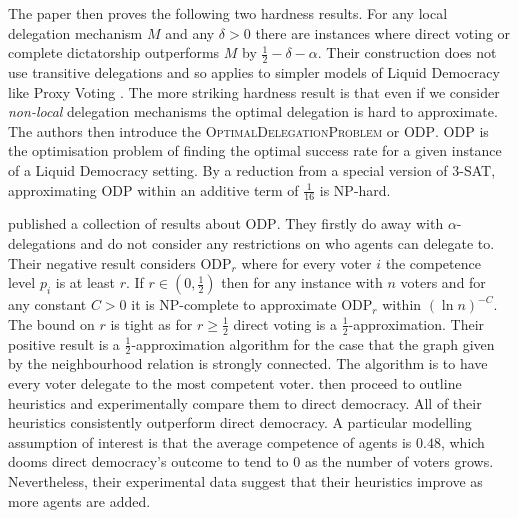 \documentclass[11pt,a4paper, titlepage]{article}
\theoremstyle{definition}
\begin{document}
The paper then proves the following two hardness results.
For any local delegation mechanism $M$ and any $\delta > 0$ there are instances where direct voting or complete dictatorship outperforms $M$ by $\frac{1}{2} - \delta - \alpha$.
Their construction does not use transitive delegations and so applies to simpler models of Liquid Democracy like Proxy Voting \citep{green2015direct}.
The more striking hardness result is that even if we consider \emph{non-local} delegation mechanisms the optimal delegation is hard to approximate.
The authors then introduce the \textsc{OptimalDelegationProblem} or \textsc{ODP}.
\textsc{ODP} is the optimisation problem of finding the optimal success rate for a given instance of a Liquid Democracy setting.
By a reduction from a special version of \textsc{3-SAT}, approximating \textsc{ODP} within an additive term of $\frac{1}{16}$ is NP-hard.

\citet{becker2021can} published a collection of results about \textsc{ODP}. 
They firstly do away with $\alpha$-delegations and do not consider any restrictions on who agents can delegate to.
Their negative result considers \textsc{ODP}$_r$ where for every voter $i$ the competence level $p_i$ is at least  $r$.
If $r \in \left(0, \frac{1}{2} \right)$ then for any instance with $n$ voters and for any constant $C > 0$ it is NP-complete to approximate \textsc{ODP}$_r$ within $(\ln n)^{-C}$.
The bound on $r$ is tight as for $r \geq \frac{1}{2}$ direct voting is a $\frac{1}{2}$-approximation.
Their positive result is a $\frac{1}{2}$-approximation algorithm for the case that the graph given by the neighbourhood relation is strongly connected.
The algorithm is to have every voter delegate to the most competent voter.
\citeauthor{becker2021can} then proceed to outline heuristics and experimentally compare them to direct democracy.
All of their heuristics consistently outperform direct democracy.
A particular modelling assumption of interest is that the average competence of agents is $0.48$, which dooms direct democracy's outcome to tend to 0 as the number of voters grows.
Nevertheless, their experimental data suggest that their heuristics improve as more agents are added.
\end{document}
